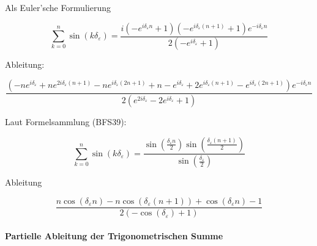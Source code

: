 \documentclass[10pt,a4paper]{article}
\begin{document}
Als Euler'sche Formulierung

\begin{equation}
\sum_{k=0}^n \sin(k\delta_{\varepsilon}) = 
\frac{i \left(- e^{i \delta_{\varepsilon} n} + 1\right) \left(- e^{i \delta_{\varepsilon} \left(n + 1\right)} + 1\right) e^{- i \delta_{\varepsilon} n}}{2 \left(- e^{i \delta_{\varepsilon}} + 1\right)}
\end{equation}

Ableitung:

\begin{equation}
\frac{\left(- n e^{i \delta_{\varepsilon}} + n e^{2 i \delta_{\varepsilon} \left(n + 1\right)} - n e^{i \delta_{\varepsilon} \left(2 n + 1\right)} + n - e^{i \delta_{\varepsilon}} + 2 e^{i \delta_{\varepsilon} \left(n + 1\right)} - e^{i \delta_{\varepsilon} \left(2 n + 1\right)}\right) e^{- i \delta_{\varepsilon} n}}{2 \left(e^{2 i \delta_{\varepsilon}} - 2 e^{i \delta_{\varepsilon}} + 1\right)}
\end{equation}

Laut Formelsammlung (BFS39):

\begin{equation}
\sum_{k=0}^n \sin(k\delta_{\varepsilon}) = 
\frac{\sin{\left (\frac{\delta_{\varepsilon} n}{2} \right )} \sin{\left (\frac{\delta_{\varepsilon} \left(n + 1\right)}{2} \right )}}{\sin{\left (\frac{\delta_{\varepsilon}}{2} \right )}}
\end{equation}

Ableitung

\begin{equation}
\frac{n \cos{\left (\delta_{\varepsilon} n \right )} - n \cos{\left (\delta_{\varepsilon} \left(n + 1\right) \right )} + \cos{\left (\delta_{\varepsilon} n \right )} - 1}{2 \left(- \cos{\left (\delta_{\varepsilon} \right )} + 1\right)}
\end{equation}


\paragraph{Partielle Ableitung der Trigonometrischen Summe}
\end{document}
